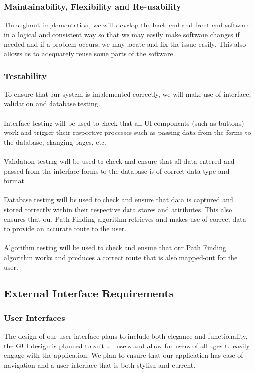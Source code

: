 \documentclass[12pt]{article}
\begin{document}
\subsubsection{Maintainability, Flexibility and Re-usability}
Throughout implementation, we will develop the back-end and front-end software in a logical and consistent way so that we may easily make software changes if needed and if a problem occurs, we may locate and fix the issue easily. This also allows us to adequately reuse some parts of the software.
\subsubsection{Testability}
To ensure that our system is implemented correctly, we will make use of interface, validation and database testing.\\\\
Interface testing will be used to check that all UI components (such as buttons) work and trigger their respective processes such as passing data from the forms to the database, changing pages, etc.\\\\
Validation testing will be used to check and ensure that all data entered and passed from the interface forms to the database is of correct data type and format.\\\\
Database testing will be used to check and ensure that data is captured and stored correctly within their respective data stores and attributes. This also ensures that our Path Finding algorithm retrieves and makes use of correct data to provide an accurate route to the user.\\\\
Algorithm testing will be used to check and ensure that our Path Finding algorithm works and produces a correct route that is also mapped-out for the user.


\subsection{External Interface Requirements}
\subsubsection{User Interfaces}
The design of our user interface plans to include both elegance and functionality, the GUI design is planned to suit all users and allow for users of all ages to easily engage with the application. We plan to ensure that our application has ease of navigation and a user interface that is both stylish and current.
\end{document}
